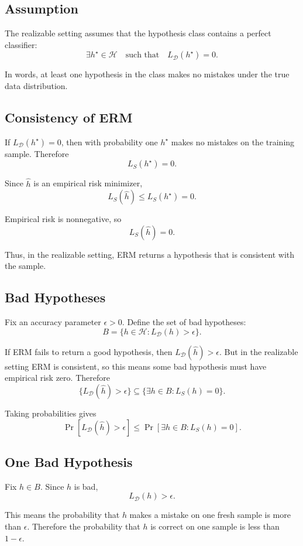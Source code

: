 \documentclass[11pt]{article}
\newcommand{\Hclass}{\mathcal{H}}
\newcommand{\Ddist}{\mathcal{D}}
\newcommand{\LD}{L_{\Ddist}}
\newcommand{\LS}{L_S}
\newcommand{\hh}{\widehat{h}}
\newcommand{\hstar}{h^\star}
\newcommand{\eps}{\epsilon}
\theoremstyle{definition}
\begin{document}
\subsection{Assumption}

The realizable setting assumes that the hypothesis class contains a perfect
classifier:
\[
  \exists \hstar\in\Hclass
  \quad\text{such that}\quad
  \LD(\hstar)=0.
\]

In words, at least one hypothesis in the class makes no mistakes under the true
data distribution.

\subsection{Consistency of ERM}

If $\LD(\hstar)=0$, then with probability one $\hstar$ makes no mistakes on the
training sample. Therefore
\[
  \LS(\hstar)=0.
\]

Since $\hh$ is an empirical risk minimizer,
\[
  \LS(\hh)\le \LS(\hstar)=0.
\]

Empirical risk is nonnegative, so
\[
  \LS(\hh)=0.
\]

Thus, in the realizable setting, ERM returns a hypothesis that is consistent
with the sample.

\subsection{Bad Hypotheses}

Fix an accuracy parameter $\eps>0$. Define the set of bad hypotheses:
\[
  B = \{h\in\Hclass : \LD(h)>\eps\}.
\]

If ERM fails to return a good hypothesis, then $\LD(\hh)>\eps$. But in the
realizable setting ERM is consistent, so this means some bad hypothesis must
have empirical risk zero. Therefore
\[
  \{\LD(\hh)>\eps\}
  \subseteq
  \{\exists h\in B : \LS(h)=0\}.
\]

Taking probabilities gives
\[
  \Pr[\LD(\hh)>\eps]
  \le
  \Pr[\exists h\in B : \LS(h)=0].
\]

\subsection{One Bad Hypothesis}

Fix $h\in B$. Since $h$ is bad,
\[
  \LD(h)>\eps.
\]

This means the probability that $h$ makes a mistake on one fresh sample is more
than $\eps$. Therefore the probability that $h$ is correct on one sample is less
than $1-\eps$.
\end{document}
